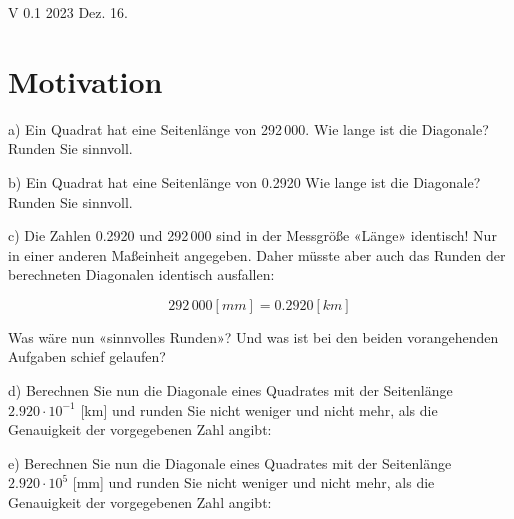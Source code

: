 
\renewcommand{\bbwAufgabenBlockID}{A1rnd}


\usepackage{amssymb} %
\renewcommand{\metaHeaderLine}{Runden}
\renewcommand{\arbeitsblattTitel}{Rationale Zahlen: Runden}

\arbeitsblattHeader{}

\begin{center}V 0.1 2023 Dez. 16.\end{center}


\section{Motivation}

a) Ein Quadrat hat eine Seitenlänge von 292\,000. Wie lange ist die
Diagonale? Runden Sie sinnvoll.


b) Ein Quadrat hat eine Seitenlänge von 0.2920  Wie lange ist die
Diagonale? Runden Sie sinnvoll.


c) 
Die Zahlen 0.2920 und 292\,000 sind in der Messgröße «Länge» identisch! Nur in einer anderen
Maßeinheit angegeben. Daher müsste aber auch
das Runden der berechneten Diagonalen identisch ausfallen:

$$292\,000 [mm] = 0.2920 [km]$$

Was wäre nun «sinnvolles Runden»? Und was ist bei den beiden
vorangehenden Aufgaben schief gelaufen?


d) Berechnen Sie nun die Diagonale eines Quadrates mit der Seitenlänge
$2.920\cdot{}10^{-1}$ [km] und runden Sie nicht weniger und nicht
mehr, als die Genauigkeit der vorgegebenen Zahl angibt:



e) Berechnen Sie nun die Diagonale eines Quadrates mit der Seitenlänge
$2.920\cdot{}10^{5}$ [mm] und runden Sie nicht weniger und nicht
mehr, als die Genauigkeit der vorgegebenen Zahl angibt:

